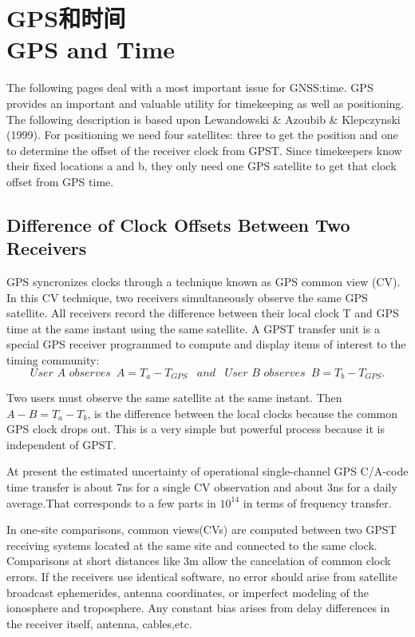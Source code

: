 \section[GPS和时间]{GPS和时间\\GPS and Time}
The following pages deal with a most important issue for GNSS:time. GPS provides an important and valuable utility for timekeeping as well as positioning. The following description is based upon Lewandowski \& Azoubib \& Klepczynski (1999). For positioning we need four satellites: three to get the position and one to determine the offset of the receiver clock from GPST. Since timekeepers know their fixed locations a and b, they only need one GPS satellite to get that clock offset from GPS time.

\subsection{Difference of Clock Offsets Between Two Receivers}

GPS syncronizes clocks through a technique known as GPS common view (CV). In this CV technique, two receivers simultaneously observe the same GPS satellite. All receivers record the difference between their local clock T and GPS time at the same instant using the same satellite. A GPST transfer unit is a special GPS receiver programmed to compute and display items of interest to the timing community:
$$
User\,\,A\,\,observes\,\,\,A=T_{a}-T_{GPS}\,\,\,\,\,and\,\,\,\,\,
User\,\,B\,\,observes\,\,\,B=T_{b}-T_{GPS}.
$$

Two users must observe the same satellite at the same instant. Then $A - B = T_{a} - T_{b}$, is the difference between the local clocks because the common GPS clock drops out. This is a very simple but powerful process because it is independent of GPST.

At present the estimated uncertainty of operational single-channel GPS C/A-code time transfer is about 7ns for a single CV observation and about 3ns for a daily average.That corresponds to a few parts in $10^{14}$ in terms of frequency transfer.

In one-site comparisons, common views(CVs) are computed between two GPST receiving systems located at the same site and connected to the same clock. Comparisons at short distances like 3m allow the cancelation of common clock errors. If the receivers use identical software, no error should arise from satellite broadcast ephemerides, antenna coordinates, or imperfect modeling of the ionosphere and troposphere. Any constant bias arises from delay differences in the receiver itself, antenna, cables,etc.

